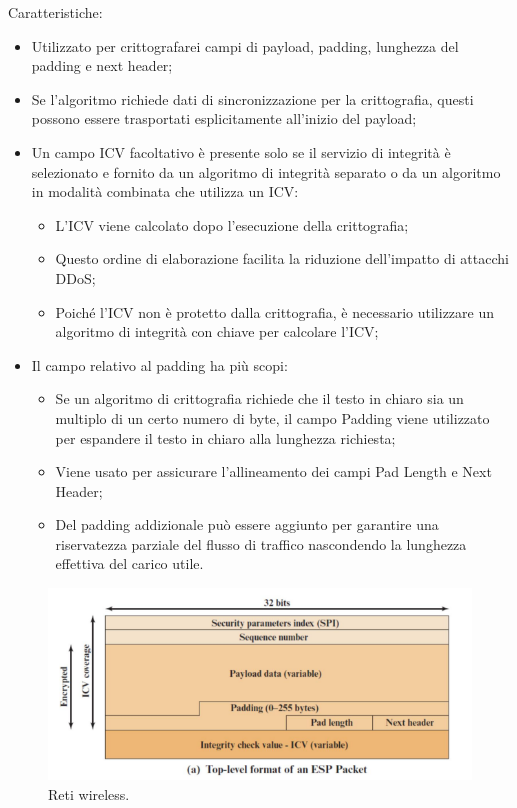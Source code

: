 Caratteristiche:
\begin{itemize}
    \item Utilizzato per crittografarei campi di payload, padding, lunghezza del padding e next header;
	\item Se l'algoritmo richiede dati di sincronizzazione per la crittografia, questi possono essere trasportati esplicitamente all'inizio del payload;
	\item Un campo ICV facoltativo è presente solo se il servizio di integrità è selezionato e fornito da un algoritmo di integrità separato o da un algoritmo in modalità combinata che utilizza un ICV:
	\begin{itemize}
	    \item L'ICV viene calcolato dopo l'esecuzione della crittografia;
		\item Questo ordine di elaborazione facilita la riduzione dell'impatto di attacchi DDoS;
		\item Poiché l'ICV non è protetto dalla crittografia, è necessario utilizzare un algoritmo di integrità con chiave per calcolare l'ICV;
	\end{itemize}
	\item Il campo relativo al padding ha più scopi:
	\begin{itemize}
	    \item Se un algoritmo di crittografia richiede che il testo in chiaro sia un multiplo di un certo numero di byte, il campo Padding viene utilizzato per espandere il testo in chiaro alla lunghezza richiesta;
		\item Viene usato per assicurare l'allineamento dei campi Pad Length e Next Header;
		\item Del padding addizionale può essere aggiunto per garantire una riservatezza parziale del flusso di traffico nascondendo la lunghezza effettiva del carico utile.
	\end{itemize}
\end{itemize}

\begin{figure}[h]
    \centering
    \includegraphics[width=1\textwidth]{images/chapter9/9-8.png}
    \caption{Reti wireless.}
    \label{fig:9-8}
\end{figure}

